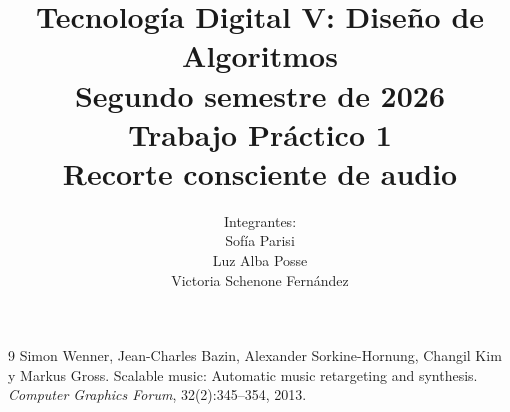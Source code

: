 \documentclass[11pt,a4paper]{article}
\title{\textbf{Tecnología Digital V: Diseño de Algoritmos}\\[0.4em]
\large Segundo semestre de 2026\\[2em]
\Huge Trabajo Práctico 1\\[0.3em]
\LARGE Recorte consciente de audio}
\author{Integrantes:\\[0.5em] Sofía Parisi\\ Luz Alba Posse\\ Victoria Schenone Fernández}
\date{}
\begin{document}
\maketitle
\thispagestyle{empty}
\tableofcontents
\newpage








\begin{thebibliography}{9}
 Simon Wenner, Jean-Charles Bazin, Alexander Sorkine-Hornung, Changil Kim y Markus Gross. Scalable music: Automatic music retargeting and synthesis. \emph{Computer Graphics Forum}, 32(2):345--354, 2013.
\end{thebibliography}
\end{document}
